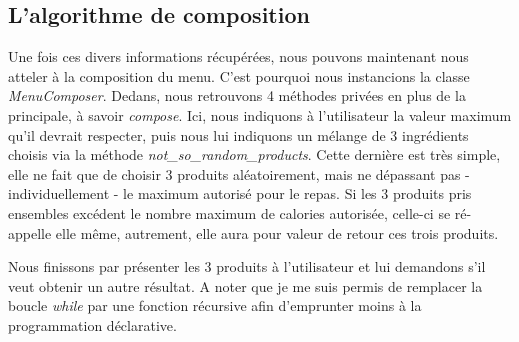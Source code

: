 \subsection{L'algorithme de composition}
Une fois ces divers informations récupérées, nous pouvons maintenant nous atteler à la composition du menu. C'est pourquoi nous instancions la classe \textit{MenuComposer}. Dedans, nous retrouvons 4 méthodes privées en plus de la principale, à savoir \textit{compose}. Ici, nous indiquons à l'utilisateur la valeur maximum qu'il devrait respecter, puis nous lui indiquons un mélange de 3 ingrédients choisis via la méthode \textit{not\_so\_random\_products}. Cette dernière est très simple, elle ne fait que de choisir 3 produits aléatoirement, mais ne dépassant pas - individuellement - le maximum autorisé pour le repas. Si les 3 produits pris ensembles excédent le nombre maximum de calories autorisée, celle-ci se ré-appelle elle même, autrement, elle aura pour valeur de retour ces trois produits.

Nous finissons par présenter les 3 produits à l'utilisateur et lui demandons s'il veut obtenir un autre résultat. A noter que je me suis permis de remplacer la boucle \textit{while} par une fonction récursive afin d'emprunter moins à la programmation déclarative.